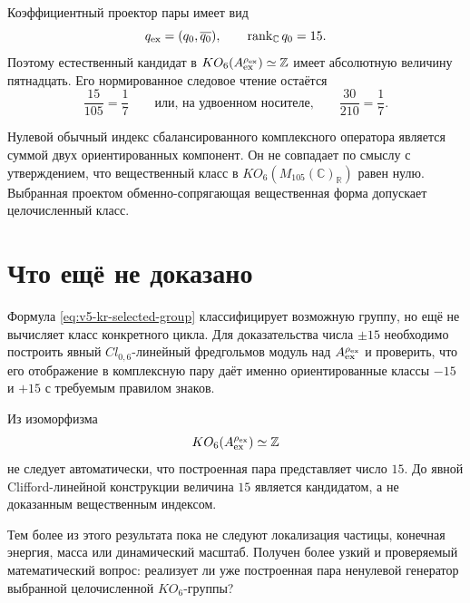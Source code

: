 Коэффициентный проектор пары имеет вид
\begin{equation}
 q_{\rm ex}=(q_0,\overline{q_0}),
 \qquad
 \operatorname{rank}_{\mathbb C}q_0=15.
\end{equation}
Поэтому естественный кандидат в
$KO_6(A_{\rm ex}^{\rho_{\rm ex}})\simeq\mathbb Z$ имеет абсолютную
величину пятнадцать. Его нормированное следовое чтение остаётся
\begin{equation}
 \frac{15}{105}=\frac17
 \qquad\text{или, на удвоенном носителе,}\qquad
 \frac{30}{210}=\frac17.
 \label{eq:v5-kr-one-seventh-survives}
\end{equation}

\begin{proposition}
Нулевой обычный индекс сбалансированного комплексного оператора является
суммой двух ориентированных компонент. Он не совпадает по смыслу с
утверждением, что вещественный класс в
$KO_6(M_{105}(\mathbb C)_{\mathbb R})$ равен нулю. Выбранная проектом
обменно-сопрягающая вещественная форма допускает целочисленный класс.
\end{proposition}

\section{Что ещё не доказано}

Формула \eqref{eq:v5-kr-selected-group} классифицирует возможную группу,
но ещё не вычисляет класс конкретного цикла. Для доказательства числа
$\pm15$ необходимо построить явный $Cl_{0,6}$-линейный фредгольмов
модуль над $A_{\rm ex}^{\rho_{\rm ex}}$ и проверить, что его отображение
в комплексную пару даёт именно ориентированные классы $-15$ и $+15$ с
требуемым правилом знаков.

\begin{nogocriterion}
Из изоморфизма
\[
 KO_6(A_{\rm ex}^{\rho_{\rm ex}})\simeq\mathbb Z
\]
не следует автоматически, что построенная пара представляет число $15$.
До явной Clifford-линейной конструкции величина $15$ является
кандидатом, а не доказанным вещественным индексом.
\end{nogocriterion}

Тем более из этого результата пока не следуют локализация частицы,
конечная энергия, масса или динамический масштаб. Получен более узкий и
проверяемый математический вопрос: реализует ли уже построенная пара
ненулевой генератор выбранной целочисленной $KO_6$-группы?

